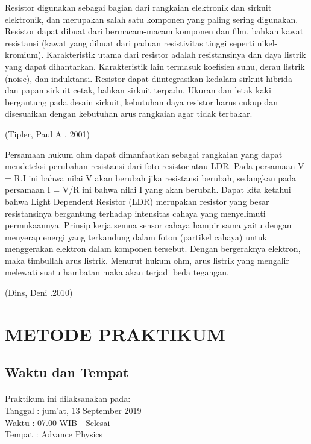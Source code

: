 \documentclass[12pt,a4paper]{article}
\begin{document}
	Resistor digunakan sebagai bagian dari rangkaian elektronik dan sirkuit elektronik, dan merupakan salah satu komponen yang paling sering digunakan. Resistor dapat dibuat dari bermacam-macam komponen dan film, bahkan kawat resistansi (kawat yang dibuat dari paduan resistivitas tinggi seperti nikel-kromium). Karakteristik utama dari resistor adalah resistansinya dan daya listrik yang dapat dihantarkan. Karakteristik lain termasuk koefisien suhu, derau listrik (noise), dan induktansi.
	Resistor dapat diintegrasikan kedalam sirkuit hibrida dan papan sirkuit cetak, bahkan sirkuit terpadu. Ukuran dan letak kaki bergantung pada desain sirkuit, kebutuhan daya resistor harus cukup dan disesuaikan dengan kebutuhan arus rangkaian agar tidak terbakar.
\begin{flushright}
(Tipler, Paul A . 2001) 
\end{flushright}
	Persamaan hukum ohm dapat dimanfaatkan sebagai rangkaian yang dapat mendeteksi perubahan resistansi dari foto-resistor atau LDR. Pada persamaan V = R.I ini bahwa nilai V akan berubah jika resistansi berubah, sedangkan pada persamaan I = V/R ini bahwa nilai I yang akan berubah. Dapat kita ketahui bahwa Light Dependent Resistor (LDR) merupakan resistor yang besar resistansinya bergantung terhadap intensitas cahaya yang menyelimuti permukaannya. Prinsip kerja semua sensor cahaya hampir sama yaitu dengan menyerap energi yang terkandung dalam foton (partikel cahaya) untuk menggerakan elektron dalam komponen tersebut. Dengan bergeraknya elektron, maka timbullah arus listrik. Menurut hukum ohm, arus listrik yang mengalir melewati suatu hambatan maka akan terjadi beda tegangan.
\begin{flushright}
(Dins, Deni .2010) 
\end{flushright}

\newpage
\section{METODE PRAKTIKUM}
\subsection{Waktu dan Tempat}
\paragraph{ }
Praktikum ini dilaksanakan pada:
\\ 		Tanggal : jum'at, 13 September 2019
\\ 		Waktu : 07.00 WIB - Selesai
\\ 		Tempat : Advance Physics 
\end{document}
